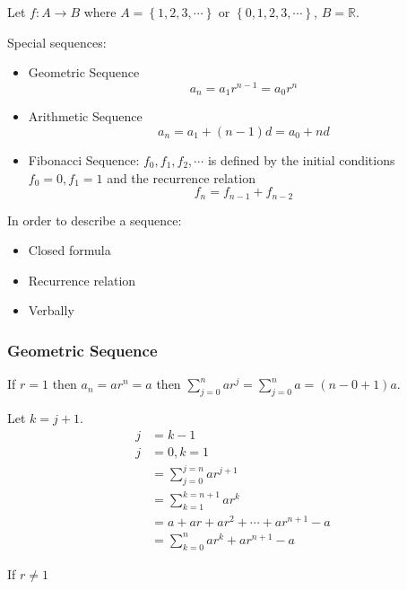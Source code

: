 \documentclass{article}
\begin{document}
Let $ f: A \rightarrow B $ where $ A = \left\{ 1, 2, 3, \cdots \right\} $ or $ \left\{ 0, 1, 2, 3, \cdots \right\} $, $ B = \mathbb{R} $.

Special sequences:
\begin{itemize}
	\item Geometric Sequence
	      \begin{equation}
		      a_n = a_1r^{n - 1} = a_0r^{n}
	      \end{equation}
	\item Arithmetic Sequence
	      \begin{equation}
		      a_n = a_1 + (n - 1)d = a_0 + nd
	      \end{equation}
	\item Fibonacci Sequence: $ f_0, f_1, f_2, \cdots $ is defined by the initial conditions $ f_0 = 0, f_1 = 1 $ and the recurrence relation
	      \begin{equation}
		      f_n = f_{n - 1} + f_{n - 2}
	      \end{equation}
\end{itemize}

In order to describe a sequence:
\begin{itemize}
	\item Closed formula
	\item Recurrence relation
	\item Verbally
\end{itemize}

\subsubsection{Geometric Sequence}

If $ r = 1 $ then $ a_n = ar^{n} = a $ then $ \sum_{j = 0}^{n} ar^{j} = \sum_{j = 0}^{n} a = (n - 0 + 1)a $.

Let $ k = j + 1 $.
\begin{align*}
	j & = k - 1                                    \\
	j & = 0, k = 1                                 \\
	  & = \sum_{j = 0}^{j = n} ar^{j + 1}          \\
	  & = \sum_{k = 1}^{k = n + 1} ar^{k}          \\
	  & = a + ar + ar^2 + \cdots + ar^{n + 1} - a  \\
	  & = \sum_{k = 0}^{n} ar^{k} + ar^{n + 1} - a
\end{align*}

If $ r \neq 1 $
\end{document}
